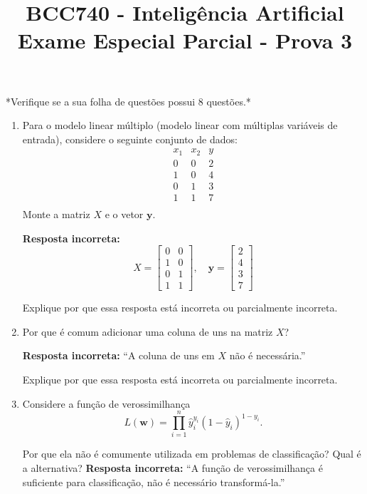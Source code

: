 \documentclass[12pt]{article}
\title{BCC740 - Inteligência Artificial \\ Exame Especial Parcial - Prova 3}
\author{}
\date{}
\begin{document}
\maketitle

\vspace{-1.5cm}

*Verifique se a sua folha de questões possui 8 questões.*

\begin{enumerate}
    \item Para o modelo linear múltiplo (modelo linear com múltiplas variáveis de entrada), considere o seguinte conjunto de dados:
    \[
    \begin{array}{ccc}
      x_1 & x_2 & y \\
      \hline
      0 & 0 & 2 \\
      1 & 0 & 4 \\
      0 & 1 & 3 \\
      1 & 1 & 7 \\
    \end{array}
    \]
    Monte a matriz \(X\) e o vetor \(\bm{y}\).

    \textbf{Resposta incorreta:}
    \[
    X = \begin{bmatrix}
    0 & 0 \\
    1 & 0 \\
    0 & 1 \\
    1 & 1
    \end{bmatrix}, \quad
    \bm{y} = \begin{bmatrix}2 \\ 4 \\ 3 \\ 7\end{bmatrix}
    \]

    Explique por que essa resposta está incorreta ou parcialmente incorreta.

    \item Por que é comum adicionar uma coluna de uns na matriz \(X\)?

    \textbf{Resposta incorreta:}  
    “A coluna de uns em \(X\) não é necessária.”

    Explique por que essa resposta está incorreta ou parcialmente incorreta.


    
    \item Considere a função de verossimilhança
    \[
    L(\bm{w}) = \prod_{i=1}^{n} \hat{y}_i^{y_i}(1-\hat{y}_i)^{1-y_i}.
    \]
    
    Por que ela não é comumente utilizada em problemas de classificação? Qual é a alternativa?  
    \textbf{Resposta incorreta:}  
    “A função de verossimilhança é suficiente para classificação, não é necessário transformá-la.”


\end{enumerate}
\end{document}
